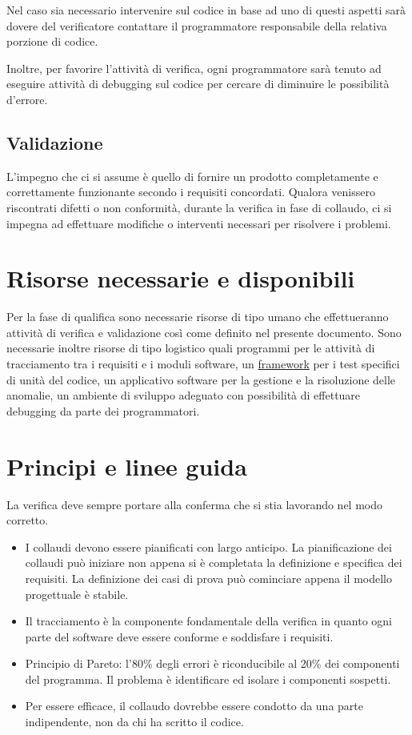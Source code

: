 Nel caso sia necessario intervenire sul codice in base ad uno di questi aspetti
sar\`a dovere del verificatore contattare il programmatore responsabile della
relativa porzione di codice.

Inoltre, per favorire l'attivit\`a di verifica, ogni programmatore sar\`a tenuto
ad eseguire attivit\`a di debugging sul codice per cercare di diminuire le
possibilit\`a d'errore.

\subsection{Validazione}

L'impegno che ci si assume \`e quello di fornire un prodotto completamente e
correttamente funzionante secondo i requisiti concordati. Qualora venissero
riscontrati difetti o non conformit\`a, durante la verifica in fase di collaudo,
ci si impegna ad effettuare modifiche o interventi necessari per risolvere i
problemi.

\section{Risorse necessarie e disponibili}

Per la fase di qualifica sono necessarie risorse di tipo umano che
effettueranno attivit\`a di verifica e validazione cos\`i come definito nel
presente documento. Sono necessarie inoltre risorse di tipo logistico quali
programmi per le attivit\`a di tracciamento tra i requisiti e i moduli software,
un \underline{framework} per i test specifici di unit\`a del codice, un
applicativo software per la gestione e la risoluzione delle anomalie, un ambiente di sviluppo
adeguato con possibilit\`a di effettuare debugging da parte dei programmatori.

\section{Principi e linee guida}

La verifica deve sempre portare alla conferma che si stia lavorando nel modo
corretto.

\begin{itemize}
\item I collaudi devono essere pianificati con largo anticipo. La pianificazione
dei collaudi pu\`o iniziare non appena si \`e completata la definizione e specifica
dei requisiti. La definizione dei casi di prova pu\`o cominciare appena il modello
progettuale \`e stabile.
\item Il tracciamento \`e la componente fondamentale della verifica in quanto ogni
parte del software deve essere conforme e soddisfare i requisiti.
\item Principio di Pareto: l'80\% degli errori \`e riconducibile al 20\% dei
componenti del programma. Il problema \`e identificare ed isolare i componenti
sospetti.
\item Per essere efficace, il collaudo dovrebbe essere condotto da una parte
indipendente, non da chi ha scritto il codice.
\end{itemize}	
	
